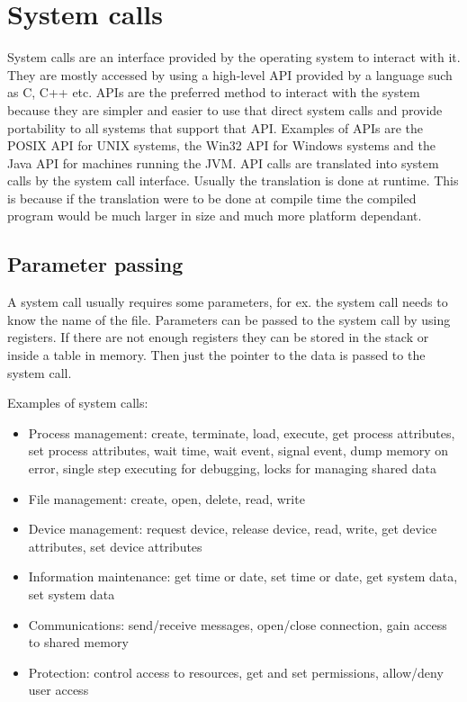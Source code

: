 \section{System calls}

System calls are an interface provided by the operating system to interact with it. They are mostly accessed by using a high-level API provided by a language such as C, C++ etc. APIs are the preferred method to interact with the system because they are simpler and easier to use that direct system calls and provide portability to all systems that support that API. Examples of APIs are the POSIX API for UNIX systems, the Win32 API for Windows systems and the Java API for machines running the JVM. API calls are translated into system calls by the system call interface. Usually the translation is done at runtime. This is because if the translation were to be done at compile time the compiled program would be much larger in size and much more platform dependant.

\subsection{Parameter passing}

A system call usually requires some parameters, for ex. the  system call needs to know the name of the file. Parameters can be passed to the system call by using registers. If there are not enough registers they can be stored in the stack or inside a table in memory. Then just the pointer to the data is passed to the system call.


Examples of system calls:
\begin{itemize}
    \item Process management: create, terminate, load, execute, get process attributes, set process attributes, wait time, wait event, signal event, dump memory on error, single step executing for debugging, locks for managing shared data
    \item File management: create, open, delete, read, write
    \item Device management: request device, release device, read, write, get device attributes, set device attributes
    \item Information maintenance: get time or date, set time or date, get system data, set system data
    \item Communications: send/receive messages, open/close connection, gain access to shared memory
    \item Protection: control access to resources, get and set permissions, allow/deny user access
\end{itemize}

